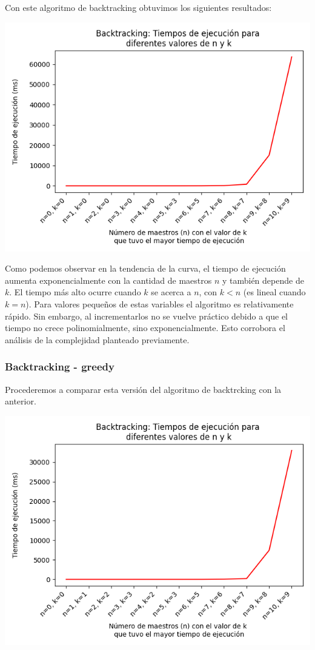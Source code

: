 \documentclass{article}
\begin{document}
Con este algoritmo de backtracking obtuvimos los siguientes resultados:

\includegraphics[scale=0.60]{images/graficoBacktracking.png}

Como podemos observar en la tendencia de la curva, el tiempo de ejecución aumenta exponencialmente con la cantidad de maestros $n$ y también depende de $k$. El tiempo más alto ocurre cuando $k$ se acerca a $n$, con $k < n$ (es lineal cuando $k = n$). Para valores pequeños de estas variables el algoritmo es relativamente rápido. Sin embargo, al incrementarlos no se vuelve práctico debido a que el tiempo no crece polinomialmente, sino exponencialmente.  Esto corrobora el análisis de la complejidad planteado previamente.

\subsubsection{Backtracking - greedy}
\label{sec:medidas-bt-greedy}
Procederemos a comparar esta versión del algoritmo de backtrcking con la anterior.

\includegraphics[scale=0.60]{images/graficoBacktrackingGreedy.png}
\end{document}
